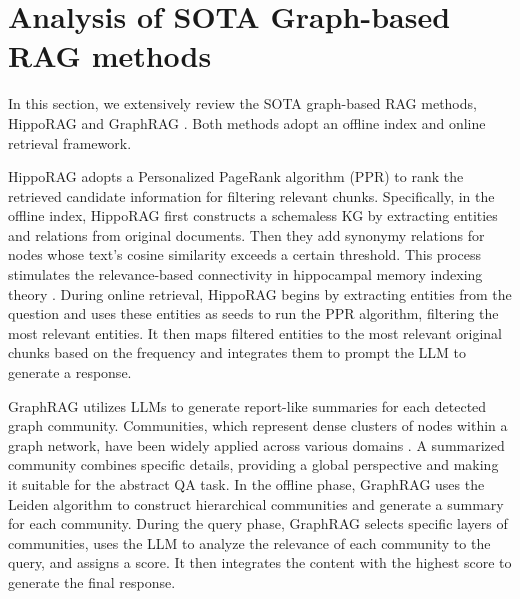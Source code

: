 \section{Analysis of SOTA Graph-based RAG methods}
\label{sec:motivation}






In this section, we extensively review the SOTA graph-based RAG methods, HippoRAG \cite{gutierrez2024hipporag} and GraphRAG \cite{edge2024local}.
% 
Both methods adopt an offline index and online retrieval framework.


HippoRAG \cite{gutierrez2024hipporag} adopts a Personalized PageRank algorithm (PPR) to rank the retrieved candidate information for filtering relevant chunks.
% 
Specifically, in the offline index, HippoRAG first constructs a schemaless KG by extracting entities and relations from original documents.
% 
Then they add synonymy relations for nodes whose text's cosine similarity exceeds a certain threshold.
% 
This process stimulates the relevance-based connectivity in hippocampal memory indexing theory \cite{teyler1986hippocampal}.
% 
During online retrieval, HippoRAG begins by extracting entities from the question and uses these entities as seeds to run the PPR algorithm, filtering the most relevant entities.
% 
It then maps filtered entities to the most relevant original chunks based on the frequency and integrates them to prompt the LLM to generate a response.

GraphRAG \cite{edge2024local} utilizes LLMs to generate report-like summaries for each detected graph community.
% 
Communities, which represent dense clusters of nodes within a graph network, have been widely applied across various domains \cite{dudleyExploitingDrugdiseaseRelationships2011,pesantez-cabreraEfficientDetectionCommunities2019,fortunatoCommunityDetectionGraphs2010,fangSurveyCommunitySearch2019,fortunatoCommunityDetectionNetworks2016,newmanFindingEvaluatingCommunity2004}. 
% 
A summarized community combines specific details, providing a global perspective and making it suitable for the abstract QA task.
% 
In the offline phase, GraphRAG uses the Leiden \cite{traag2019louvain} algorithm to construct hierarchical communities and generate a summary for each community.
% 
During the query phase, GraphRAG selects specific layers of communities, uses the LLM to analyze the relevance of each community to the query, and assigns a score. 
% 
It then integrates the content with the highest score to generate the final response.


